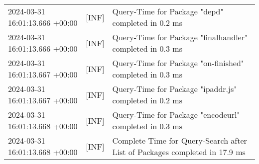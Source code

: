 {{\begin{tabularx}{\textwidth}{|l|l|X|}
                    2024-03-31 16:01:13.666 +00:00 & [INF] & Query-Time for Package "depd" completed in 0.2 ms \\
                    2024-03-31 16:01:13.666 +00:00 & [INF] & Query-Time for Package "finalhandler" completed in 0.3 ms \\
                    2024-03-31 16:01:13.667 +00:00 & [INF] & Query-Time for Package "on-finished" completed in 0.3 ms \\
                    2024-03-31 16:01:13.667 +00:00 & [INF] & Query-Time for Package "ipaddr.js" completed in 0.2 ms \\
                    2024-03-31 16:01:13.668 +00:00 & [INF] & Query-Time for Package "encodeurl" completed in 0.3 ms \\
                    2024-03-31 16:01:13.668 +00:00 & [INF] & Complete Time for Query-Search after List of Packages completed in 17.9 ms \\
                    \hline
                \end{tabularx}
            }
        }

